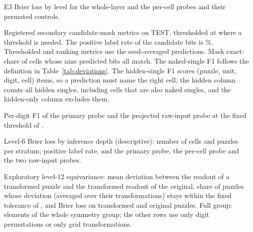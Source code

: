 \begin{table}[htbp]
\centering
\caption{E3 Brier loss by level for the whole-layer and the per-cell probes and their permuted controls.}
\label{tab:levels}
\footnotesize
{}
\end{table}

\begin{table}[htbp]
\centering
\caption{Registered secondary candidate-mask metrics on TEST, thresholded at  where a threshold is needed. The positive label rate of the candidate bits is \%. Thresholded and ranking metrics use the seed-averaged predictions. Mask exact: share of cells whose nine predicted bits all match. The naked-single F1 follows the definition in Table~\ref{tab:deviations}. The hidden-single F1 scores (puzzle, unit, digit, cell) items, so a prediction must name the right cell; the hidden column counts all hidden singles, including cells that are also naked singles, and the hidden-only column excludes them.}
\label{tab:secondary}
\scriptsize
\setlength{\tabcolsep}{3pt}
\end{table}

\begin{table}[htbp]
\centering
\caption{Per-digit F1 of the primary probe and the projected raw-input probe at the fixed threshold of .}
\label{tab:per-digit}
\footnotesize
{}
\end{table}

\begin{table}[htbp]
\centering
\caption{Level-6 Brier loss by inference depth (descriptive): number of cells and puzzles per stratum, positive label rate, and the primary probe, the per-cell probe and the two raw-input probes.}
\label{tab:depth}
\footnotesize
\setlength{\tabcolsep}{3pt}
\end{table}

\begin{table}[htbp]
\centering
\caption{Exploratory level-12 equivariance: mean deviation between the readout of a transformed puzzle and the transformed readout of the original, share of puzzles whose deviation (averaged over their transformations) stays within the fixed tolerance of , and Brier loss on transformed and original puzzles. Full group: elements of the whole symmetry group; the other rows use only digit permutations or only grid transformations.}
\label{tab:equivariance}
\footnotesize
{}
\end{table}
